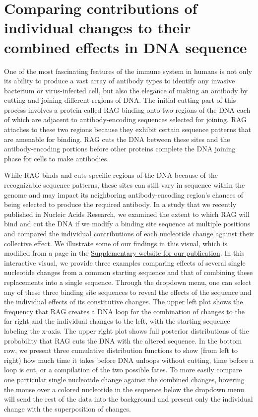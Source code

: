 \documentclass[11pt, oneside]{article}   	%
\begin{document}
\section*{Comparing contributions of individual changes to their combined effects in DNA sequence}
\author{Griffin Chure, Soichi Hirokawa}

One of the most fascinating features of the immune system in humans is not
only its ability to produce a vast array of antibody types to identify any
invasive bacterium or virus-infected cell, but also the elegance of making
an antibody by cutting and joining different regions of DNA. The
initial cutting part of this process involves a protein called RAG
binding onto two regions of the DNA each of which are adjacent
to antibody-encoding sequences selected for joining. RAG attaches to these
two regions because they exhibit certain sequence patterns that are amenable
for binding. RAG cuts the DNA between these sites and the antibody-encoding
portions before other proteins complete the DNA joining phase for cells to
make antibodies.

While RAG binds and cuts specific regions of the DNA because of the
recognizable sequence patterns, these sites can still vary in sequence within
the genome and may impact its neighboring antibody-encoding region's chances of
being selected to produce the required antibody. In a study that we recently
published in Nucleic Acids Research,
we examined the extent to which RAG will bind and cut the DNA if we modify a
binding site sequence at multiple positions and compared the individual contributions of
each nucleotide change against their collective effect. We illustrate some of
our findings in this visual, which is modified from a page in the
\href{https://www.rpgroup.caltech.edu/vdj_recombination}{Supplementary website for our publication}. In this interactive
visual, we provide three examples comparing effects of several single
nucleotide changes from a common starting sequence and that of combining these
replacements into a single sequence. Through the dropdown menu, one can
select any of these three binding site sequences to reveal the effects of the
sequence and the individual effects of its constitutive changes. The upper
left plot shows the frequency that RAG creates a DNA loop for the combination
of changes to the far right and the individual changes to the left, with
the starting sequence labeling the x-axis. The upper right plot shows full posterior distributions of the probability that
RAG cuts the DNA with the altered sequence. In the bottom row, we present
three cumulative distribution functions to show (from left to right) how much
time it takes before DNA unloops without cutting, time before a loop is cut, or a compilation of
the two possible fates. To more easily compare one particular single
nucleotide change against the combined changes, hovering the mouse over a
colored nucleotide in the sequence below the dropdown menu will send the rest
of the data into the background and present only the individual change with
the superposition of changes.
\end{document}
